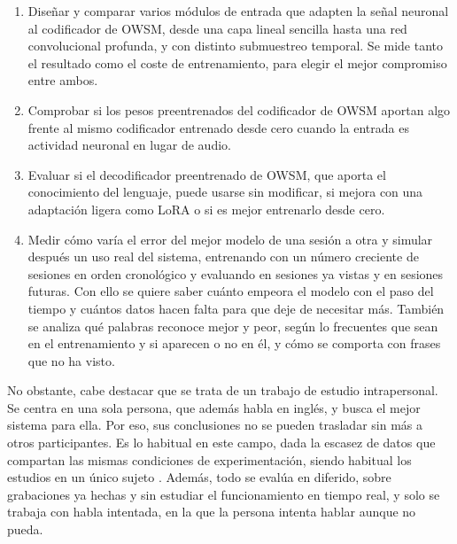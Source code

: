 \begin{enumerate}[label=\textbf{O\arabic*.}, leftmargin=*, itemsep=0.4em]

  \item Diseñar y comparar varios módulos de entrada que adapten la señal neuronal al codificador de OWSM, desde una capa lineal sencilla hasta una red convolucional profunda, y con distinto submuestreo temporal. Se mide tanto el resultado como el coste de entrenamiento, para elegir el mejor compromiso entre ambos.

  \item Comprobar si los pesos preentrenados del codificador de OWSM aportan algo frente al mismo codificador entrenado desde cero cuando la entrada es actividad neuronal en lugar de audio.

  \item Evaluar si el decodificador preentrenado de OWSM, que aporta el conocimiento del lenguaje, puede usarse sin modificar, si mejora con una adaptación ligera como LoRA \cite{hu2022lora} o si es mejor entrenarlo desde cero.

 \item Medir cómo varía el error del mejor modelo de una sesión a otra y simular después un uso real del sistema, entrenando con un número creciente de sesiones en orden cronológico y evaluando en sesiones ya vistas y en sesiones futuras. Con ello se quiere saber cuánto empeora el modelo con el paso del tiempo y cuántos datos hacen falta para que deje de necesitar más. También se analiza qué palabras reconoce mejor y peor, según lo frecuentes que sean en el entrenamiento y si aparecen o no en él, y cómo se comporta con frases que no ha visto.

\end{enumerate}

No obstante, cabe destacar que se trata de un trabajo de estudio intrapersonal. Se centra en una sola persona, que además habla en inglés, y busca el mejor sistema para ella. Por eso, sus conclusiones no se pueden trasladar sin más a otros participantes. Es lo habitual en este campo, dada la escasez de datos que compartan las mismas condiciones de experimentación, siendo habitual los estudios en un único sujeto \cite{willett2023,card2024}. Además, todo se evalúa en diferido, sobre grabaciones ya hechas y sin estudiar el funcionamiento en tiempo real, y solo se trabaja con habla intentada, en la que la persona intenta hablar aunque no pueda.

